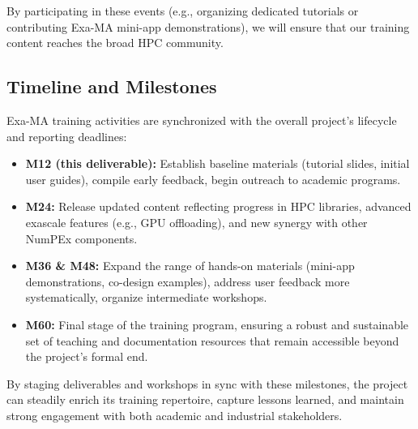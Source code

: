 By participating in these events (e.g., organizing dedicated tutorials or contributing Exa-MA mini-app demonstrations), we will ensure that our training content reaches the broad HPC community.

\subsection{Timeline and Milestones}
Exa-MA training activities are synchronized with the overall project’s lifecycle and reporting deadlines:
\begin{itemize}
    \item \textbf{M12 (this deliverable):} 
    Establish baseline materials (tutorial slides, initial user guides), compile early feedback, begin outreach to academic programs.
    \item \textbf{M24:}
    Release updated content reflecting progress in HPC libraries, advanced exascale features (e.g., GPU offloading), and new synergy with other NumPEx components.
    \item \textbf{M36 \& M48:}
    Expand the range of hands-on materials (mini-app demonstrations, co-design examples), address user feedback more systematically, organize intermediate workshops.
    \item \textbf{M60:}
    Final stage of the training program, ensuring a robust and sustainable set of teaching and documentation resources that remain accessible beyond the project’s formal end.
\end{itemize}

By staging deliverables and workshops in sync with these milestones, the project can steadily enrich its training repertoire, capture lessons learned, and maintain strong engagement with both academic and industrial stakeholders.